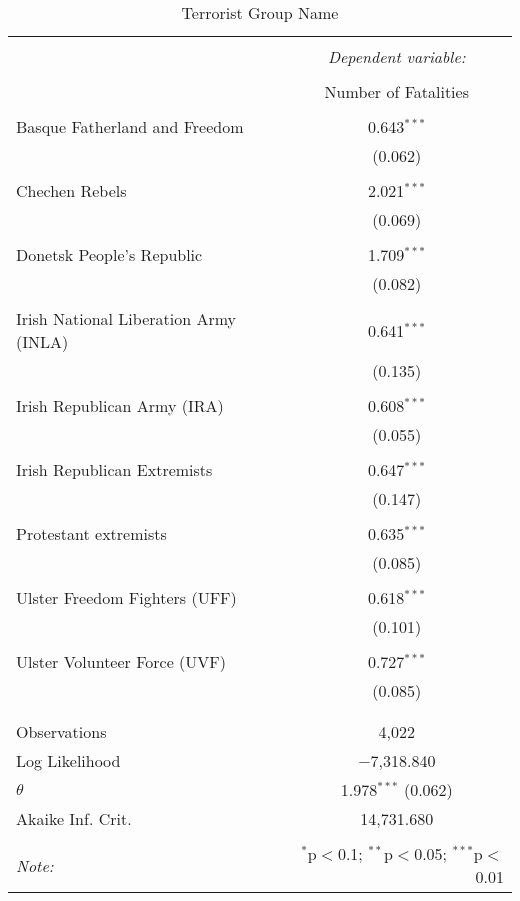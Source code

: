 
\begin{table}[!htbp] \centering 
  \caption{Terrorist Group Name} 
  \label{} 
\begin{tabular}{@{\extracolsep{5pt}}lc} 
\\[-1.8ex]\hline 
\hline \\[-1.8ex] 
 & \multicolumn{1}{c}{\textit{Dependent variable:}} \\ 
\cline{2-2} 
\\[-1.8ex] & Number of Fatalities \\ 
\hline \\[-1.8ex] 
 Basque Fatherland and Freedom & 0.643$^{***}$ \\ 
  & (0.062) \\ 
  & \\ 
 Chechen Rebels & 2.021$^{***}$ \\ 
  & (0.069) \\ 
  & \\ 
 Donetsk People's Republic & 1.709$^{***}$ \\ 
  & (0.082) \\ 
  & \\ 
 Irish National Liberation Army (INLA) & 0.641$^{***}$ \\ 
  & (0.135) \\ 
  & \\ 
 Irish Republican Army (IRA) & 0.608$^{***}$ \\ 
  & (0.055) \\ 
  & \\ 
 Irish Republican Extremists & 0.647$^{***}$ \\ 
  & (0.147) \\ 
  & \\ 
 Protestant extremists & 0.635$^{***}$ \\ 
  & (0.085) \\ 
  & \\ 
 Ulster Freedom Fighters (UFF) & 0.618$^{***}$ \\ 
  & (0.101) \\ 
  & \\ 
 Ulster Volunteer Force (UVF) & 0.727$^{***}$ \\ 
  & (0.085) \\ 
  & \\ 
\hline \\[-1.8ex] 
Observations & 4,022 \\ 
Log Likelihood & $-$7,318.840 \\ 
$\theta$ & 1.978$^{***}$  (0.062) \\ 
Akaike Inf. Crit. & 14,731.680 \\ 
\hline 
\hline \\[-1.8ex] 
\textit{Note:}  & \multicolumn{1}{r}{$^{*}$p$<$0.1; $^{**}$p$<$0.05; $^{***}$p$<$0.01} \\ 
\end{tabular} 
\end{table} 
